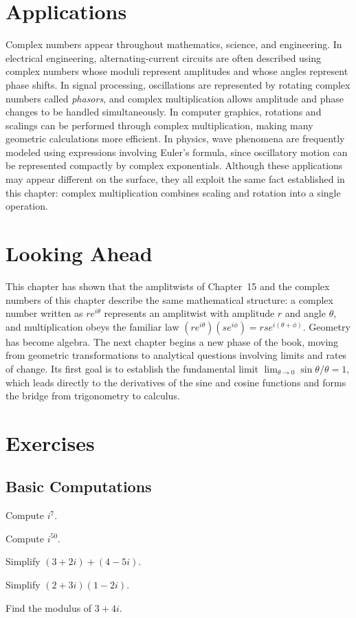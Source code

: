 \section{Applications}

Complex numbers appear throughout mathematics, science, and engineering.
In electrical engineering, alternating-current circuits are often
described using complex numbers whose moduli represent amplitudes and
whose angles represent phase shifts. In signal processing, oscillations
are represented by rotating complex numbers called \emph{phasors}, and
complex multiplication allows amplitude and phase changes to be handled
simultaneously. In computer graphics, rotations and scalings can be
performed through complex multiplication, making many geometric
calculations more efficient. In physics, wave phenomena are frequently
modeled using expressions involving Euler's formula, since oscillatory
motion can be represented compactly by complex exponentials. Although
these applications may appear different on the surface, they all exploit
the same fact established in this chapter: complex multiplication
combines scaling and rotation into a single operation.

\section{Looking Ahead}

This chapter has shown that the amplitwists of Chapter~15 and the
complex numbers of this chapter describe the same mathematical
structure: a complex number written as $re^{i\theta}$ represents an
amplitwist with amplitude $r$ and angle $\theta$, and multiplication
obeys the familiar law $(re^{i\theta})(se^{i\phi}) =
rse^{i(\theta+\phi)}$. Geometry has become algebra. The next chapter
begins a new phase of the book, moving from geometric transformations to
analytical questions involving limits and rates of change. Its first goal
is to establish the fundamental limit $\lim_{\theta\to0} \sin\theta/\theta
= 1$, which leads directly to the derivatives of the sine and cosine
functions and forms the bridge from trigonometry to calculus.

\section{Exercises}

\subsection*{Basic Computations}
\begin{exercise}
Compute $i^7$.
\end{exercise}
\begin{exercise}
Compute $i^{50}$.
\end{exercise}
\begin{exercise}
Simplify $(3+2i)+(4-5i)$.
\end{exercise}
\begin{exercise}
Simplify $(2+3i)(1-2i)$.
\end{exercise}
\begin{exercise}
Find the modulus of $3+4i$.
\end{exercise}

